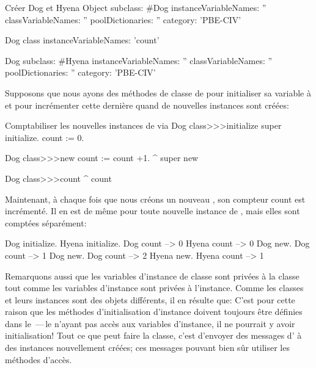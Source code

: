 \documentclass[a4paper,10pt,twoside]{book}
\begin{document}
\begin{classdef}[dog]{Créer Dog et Hyena}
Object subclass: #Dog
	instanceVariableNames: ''
	classVariableNames: ''
	poolDictionaries: ''
	category: 'PBE-CIV'

Dog class
	instanceVariableNames: 'count'

Dog subclass: #Hyena
	instanceVariableNames: ''
	classVariableNames: ''
	poolDictionaries: ''
	category: 'PBE-CIV'
\end{classdef}

Supposons que nous ayons des méthodes de classe de  pour initialiser sa variable  à  et pour incrémenter cette dernière quand de nouvelles instances sont créées:
\begin{method}[dogcount]{Comptabiliser les nouvelles instances de  via }
Dog class>>>initialize
	super initialize.
	count := 0.

Dog class>>>new
	count := count +1.
	^ super new

Dog class>>>count
	^ count
\end{method}

Maintenant, à chaque fois que nous créons un nouveau , son compteur
count est incrémenté. Il en est de même pour toute nouvelle instance de , mais elles sont comptées séparément:
\begin{code}{}
Dog initialize.
Hyena initialize.
Dog count     --> 0
Hyena count --> 0
Dog new.
Dog count     --> 1
Dog new.
Dog count     --> 2
Hyena new.
Hyena count --> 1
\end{code}

Remarquons aussi que les variables d'instance de classe sont privées à la classe tout comme les variables d'instance sont privées à l'instance. 
Comme les classes et leurs instances sont des objets différents,
il en résulte que:
C'est pour cette raison que les méthodes d'initialisation d'instance doivent 
toujours être définies dans le \,---\,le  n'ayant pas accès aux variables d'instance, il ne pourrait y avoir initiali\-sation!  
Tout ce que peut faire la classe, c'est d'envoyer des messages d' à des instances nouvellement créées; ces messages pouvant bien sûr utiliser les méthodes d'accès.
\end{document}

